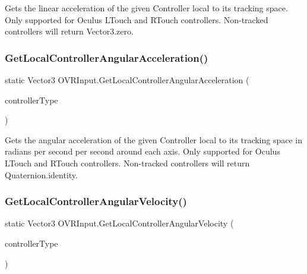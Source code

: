 Gets the linear acceleration of the given Controller local to its tracking space. Only supported for Oculus L\+Touch and R\+Touch controllers. Non-\/tracked controllers will return Vector3.\+zero. 

\mbox{\label{class_o_v_r_input_a065d9defd470387ea588a374d2c1c6b3}} 
\subsubsection{\texorpdfstring{Get\+Local\+Controller\+Angular\+Acceleration()}{GetLocalControllerAngularAcceleration()}}
{\footnotesize\ttfamily static Vector3 O\+V\+R\+Input.\+Get\+Local\+Controller\+Angular\+Acceleration (\begin{DoxyParamCaption}\item[{\mbox{\hyperlink{class_o_v_r_input_a5c86f9052a9cbb0b73779ff5704d60a8}{O\+V\+R\+Input.\+Controller}}}]{controller\+Type }\end{DoxyParamCaption})\hspace{0.3cm}{\ttfamily [static]}}



Gets the angular acceleration of the given Controller local to its tracking space in radians per second per second around each axis. Only supported for Oculus L\+Touch and R\+Touch controllers. Non-\/tracked controllers will return Quaternion.\+identity. 

\mbox{\label{class_o_v_r_input_a98fc49ac302d343de505be72f6aec495}} 
\subsubsection{\texorpdfstring{Get\+Local\+Controller\+Angular\+Velocity()}{GetLocalControllerAngularVelocity()}}
{\footnotesize\ttfamily static Vector3 O\+V\+R\+Input.\+Get\+Local\+Controller\+Angular\+Velocity (\begin{DoxyParamCaption}\item[{\mbox{\hyperlink{class_o_v_r_input_a5c86f9052a9cbb0b73779ff5704d60a8}{O\+V\+R\+Input.\+Controller}}}]{controller\+Type }\end{DoxyParamCaption})\hspace{0.3cm}{\ttfamily [static]}}



